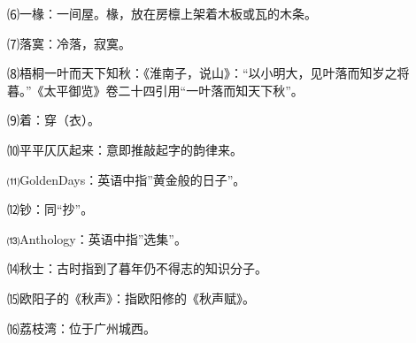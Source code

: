 \documentclass[letterpaper,12pt,english]{sphinxmanual}
\begin{document}
⑹一椽：一间屋。椽，放在房檩上架着木板或瓦的木条。

⑺落寞：冷落，寂寞。

⑻梧桐一叶而天下知秋：《淮南子，说山》：“以小明大，见叶落而知岁之将暮。”《太平御览》卷二十四引用“一叶落而知天下秋”。

⑼着：穿（衣）。

⑽平平仄仄起来：意即推敲起字的韵律来。

⑾GoldenDays：英语中指”黄金般的日子”。

⑿钞：同“抄”。

⒀Anthology：英语中指”选集”。

⒁秋士：古时指到了暮年仍不得志的知识分子。

⒂欧阳子的《秋声》：指欧阳修的《秋声赋》。

⒃荔枝湾：位于广州城西。
\end{document}
